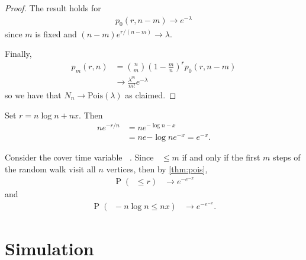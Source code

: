 \documentclass[12pt]{article}
\theoremstyle{definition}
\DeclareMathOperator{\pr}{\mathrm{P}}		     %
\DeclareMathOperator{\cov}{\uptau_\textrm{cov}}  %
\begin{document}
\begin{proof}
The result holds for
\begin{align}
p_0(r,n-m) \rightarrow e^{-\lambda} \nonumber
\end{align}
since $m$ is fixed and $(n-m)e^{r/(n-m)} \rightarrow \lambda$.

Finally,
\begin{align}
p_m(r,n) &= {n \choose m} (1-\frac{m}{n})^r p_0(r, n-m) \nonumber \\
&\rightarrow \frac{\lambda^m}{ m!} e^{-\lambda} \nonumber
\end{align}
so we have that $N_n \rightarrow \textrm{Pois}(\lambda)$ as claimed.

\end{proof}



Set $r = n \log n + nx$.
Then 
\begin{align}
ne^{-r/n} &= n e ^{- \log n - x} \nonumber \\
&= n e {- \log n} e^ {- x} = e^{-x}.\nonumber
\end{align}

Consider the cover time variable $\cov$.
Since $\cov \leq m$ if and only if the first $m$ steps
of the random walk visit all $n$ vertices, then by \cref{thm:pois},
\begin{align}
\pr(\cov \leq r) &\rightarrow e^{-e^{-x}} \nonumber
\end{align}
and
\begin{align}
\pr(\cov - n \log n\leq nx) &\rightarrow e^{-e^{-x}}. \nonumber
\end{align}




\section{Simulation}

\cite{Bo98}
\cite{Gr10}

\newpage
{}

\begin{comment}
\begin{thebibliography}{9}

\bibitem{AF14}
	Aldous, D. and J. Fill.
	2014.
	\textit{Reversible Markov Chains and Random Walks on Graphs}.

\bibitem{BH94}
	Blom, G., L. Holst and D. Sandell.
	\textit{Problems and Snapshots from the World of Probability},
	Springer Science \& Business Media, 1994.

\bibitem{Bo13}
	Bollobás, B.
	2013.
	\textit{Modern Graph Theory},
	Vol. 184,
	Springer Science \& Business Media.

\bibitem{DS84}
	Doyle, P. G. and J. L. Snell.
	1984.
	\textit{Random Walks and Electric Networks},
	Mathematical Association of America.
 
\bibitem{Gr10}
	Grimmett, G.
	2010.
	\textit{Probability on Graphs : Random Processes on Graphs and Lattices},
	Vol. 8,
	Cambridge University Press.

\bibitem{LP08}
	Levin, D. A. and Y. Peres.
	2017.
	\textit{Markov Chains and Mixing Times},
	Vol. 107,
	American Mathematical Society.

\end{thebibliography}
\end{comment}
\end{document}
